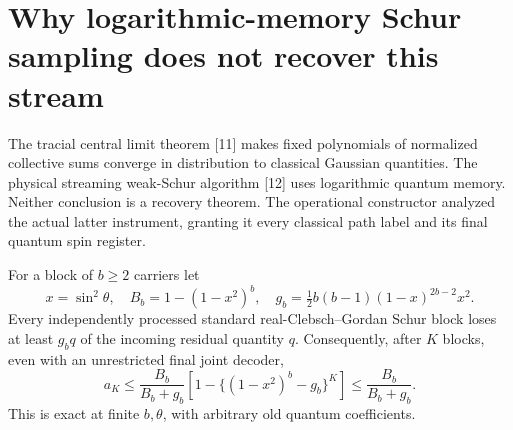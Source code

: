 \section{Why logarithmic-memory Schur sampling does not recover this stream}
The tracial central limit theorem [11] makes fixed polynomials of normalized
collective sums converge in distribution to classical Gaussian quantities.
The physical streaming weak-Schur algorithm [12] uses logarithmic quantum
memory. Neither conclusion is a recovery theorem. The operational
constructor analyzed the actual latter instrument, granting it every
classical path label and its final quantum spin register.

For a block of $b\ge2$ carriers let
\[
 x=\sin^2\theta,\quad B_b=1-(1-x^2)^b,\quad
 g_b=\tfrac12b(b-1)(1-x)^{2b-2}x^2.
\]
Every independently processed standard real-Clebsch--Gordan Schur block
loses at least $g_bq$ of the incoming residual quantity $q$. Consequently,
after $K$ blocks, even with an unrestricted final joint decoder,
\begin{equation}
 a_K\le\frac{B_b}{B_b+g_b}
 \left[1-\{(1-x^2)^b-g_b\}^K\right]
 \le\frac{B_b}{B_b+g_b}.\label{eq:schurfailure}
\end{equation}
This is exact at finite $b,\theta$, with arbitrary old quantum coefficients.

